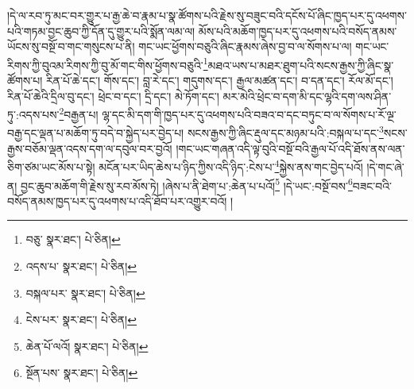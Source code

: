 །དེ་ལ་རབ་ཏུ་མང་བར་གྱུར་པ་རྒྱ་ཆེ་བ་རྣམ་པ་སྣ་ཚོགས་པའི་རྗེས་སུ་བཟུང་བའི་དངོས་པོ་ཞིང་ཁྱད་པར་དུ་འཕགས་པའི་གཏམ་བྱང་ཆུབ་ཀྱི་དོན་དུ་གྱུར་པའི་སྨོན་ལམ་ལ། མོས་པའི་མཆོག་ཁྱད་པར་དུ་འཕགས་པའི་བསོད་ནམས་ཡོངས་སུ་བསྔོ་བ་གང་གསུངས་པ་ནི། གང་ཡང་ཕྱོགས་བཅུའི་ཞིང་རྣམས་ཞེས་བྱ་བ་ལ་སོགས་པ་ལ། གང་ཡང་རིགས་ཀྱི་བུའམ་རིགས་ཀྱི་བུ་མོ་གང་གིས་ཕྱོགས་བཅུའི་\footnote{བཅུ་  སྣར་ཐང་།  པེ་ཅིན། }མཐའ་ཡས་པ་མཐར་ཐུག་པའི་སངས་རྒྱས་ཀྱི་ཞིང་སྣ་ཚོགས་པ། རིན་པོ་ཆེ་དང་། གོས་དང་། བླ་རེ་དང་། གདུགས་དང་། རྒྱལ་མཚན་དང་། བ་དན་དང་། རོལ་མོ་དང་། རིན་པོ་ཆེའི་དྲིལ་བུ་དང་། ཕྲེང་བ་དང་། དྲི་དང་། མེ་ཏོག་དང་། མར་མེའི་ཕྲེང་བ་དག་མི་དང་ལྷའི་དག་ལས་ཤིན་ཏུ་:འདས་པས་\footnote{འདས་པ་  སྣར་ཐང་།  པེ་ཅིན། }བརྒྱན་པ། ལྷ་དང་མི་དག་གི་ཁྱད་པར་དུ་འཕགས་པའི་བཟའ་བ་དང་བཏུང་བ་ལ་སོགས་པ་རོ་ལྔ་བརྒྱ་དང་ལྡན་པ་མཆོག་ཏུ་བདེ་བ་སྐྱེད་པར་བྱེད་པ། སངས་རྒྱས་ཀྱི་ཞིང་རྡུལ་དང་མཉམ་པའི་:བསྐལ་པ་དང་\footnote{བསྐལ་པར་  སྣར་ཐང་།  པེ་ཅིན། }སངས་རྒྱས་བཅོམ་ལྡན་འདས་དག་ལ་དབུལ་བར་བྱའོ། །གང་ཡང་གཞན་འདི་ལྟ་བུའི་བསྔོ་བའི་རྒྱལ་པོ་འདི་ཐོས་ནས་ལན་ཅིག་ཙམ་ཡང་མོས་པ་སྟེ། མངོན་པར་ཡིད་ཆེས་པ་ཉིད་ཀྱིས་འདི་ཉིད་:ངེས་པ་\footnote{ངེས་པར་  སྣར་ཐང་།  པེ་ཅིན། }སྐྱེས་ནས་གང་བྱེད་པའོ། །དེ་གང་ཞེ་ན། བྱང་ཆུབ་མཆོག་གི་རྗེས་སུ་རབ་མོས་ཏེ། །ཞེས་པ་ནི་ཐེག་པ་:ཆེན་པ་པའོ།\footnote{ཆེན་པོ་ལའོ།  སྣར་ཐང་།  པེ་ཅིན། } །དེ་ཡང་:བསྔོ་བས་\footnote{སྔོན་པས་  སྣར་ཐང་།  པེ་ཅིན། }བཟང་བའི་བསོད་ནམས་ཁྱད་པར་དུ་འཕགས་པ་འདི་ཐོབ་པར་འགྱུར་བའོ། །
